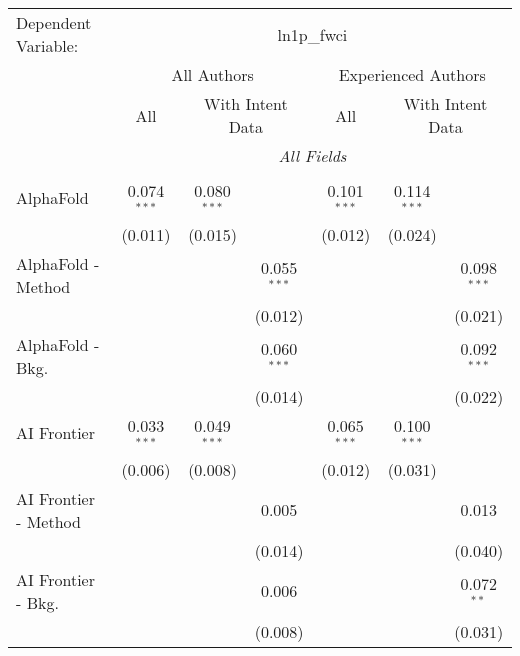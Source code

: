 \begingroup
\centering
\begin{tabular}{lcccccc}
   \tabularnewline \midrule \midrule
   Dependent Variable: & \multicolumn{6}{c}{ln1p\_fwci}\\
 & \multicolumn{3}{c}{All Authors} & \multicolumn{3}{c}{Experienced Authors} \\
\cmidrule(lr){2-4} \cmidrule(lr){5-7}
 & \multicolumn{1}{c}{All} & \multicolumn{2}{c}{With Intent Data} & \multicolumn{1}{c}{All} & \multicolumn{2}{c}{With Intent Data} \\
\cmidrule(lr){2-2} \cmidrule(lr){3-4} \cmidrule(lr){5-5} \cmidrule(lr){6-7}
 & \multicolumn{6}{c}{\textit{All Fields}} \\ \\
   AlphaFold            & 0.074$^{***}$ & 0.080$^{***}$ &               & 0.101$^{***}$ & 0.114$^{***}$ &   \\   
                        & (0.011)       & (0.015)       &               & (0.012)       & (0.024)       &   \\   
   AlphaFold - Method   &               &               & 0.055$^{***}$ &               &               & 0.098$^{***}$\\   
                        &               &               & (0.012)       &               &               & (0.021)\\   
   AlphaFold - Bkg.     &               &               & 0.060$^{***}$ &               &               & 0.092$^{***}$\\   
                        &               &               & (0.014)       &               &               & (0.022)\\   
   AI Frontier          & 0.033$^{***}$ & 0.049$^{***}$ &               & 0.065$^{***}$ & 0.100$^{***}$ &   \\   
                        & (0.006)       & (0.008)       &               & (0.012)       & (0.031)       &   \\   
   AI Frontier - Method &               &               & 0.005         &               &               & 0.013\\   
                        &               &               & (0.014)       &               &               & (0.040)\\   
   AI Frontier - Bkg.   &               &               & 0.006         &               &               & 0.072$^{**}$\\   
                        &               &               & (0.008)       &               &               & (0.031)\\   

\end{tabular}
